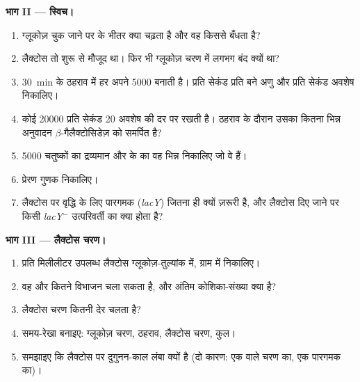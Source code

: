 \begin{problem}
\medskip
\noindent\textbf{भाग II --- स्विच।}
\begin{enumerate}[resume]
  \item ग्लूकोज़ चुक जाने पर  के भीतर क्या चढ़ता है और वह किससे
        बँधता है?
  \item लैक्टोस तो शुरू से मौजूद था। फिर भी ग्लूकोज़ चरण में 
        लगभग बंद क्यों था?
  \item \qty{30}{min} के ठहराव में हर  अपने \num{5000}
         बनाती है। प्रति सेकंड प्रति  बने  अणु और
        प्रति सेकंड अवशेष निकालिए।
  \item कोई  \num{20000}  प्रति सेकंड \qty{20}{} अवशेष
        की दर पर रखती है। ठहराव के दौरान उसका कितना भिन्न अनुवादन
        $\beta$-गैलैक्टोसिडेज़ को समर्पित है?
  \item \num{5000} चतुष्कों का द्रव्यमान और  के  का वह
        भिन्न निकालिए जो वे हैं।
  \item प्रेरण गुणक निकालिए।
  \item लैक्टोस पर वृद्धि के लिए पारगमक (\emph{lacY})  जितना ही
        क्यों ज़रूरी है, और लैक्टोस दिए जाने पर किसी \emph{lacY}$^-$
        उत्परिवर्ती का क्या होता है?
\end{enumerate}

\medskip
\noindent\textbf{भाग III --- लैक्टोस चरण।}
\begin{enumerate}[resume]
  \item प्रति मिलीलीटर उपलब्ध लैक्टोस ग्लूकोज़-तुल्यांक में, ग्राम में
        निकालिए।
  \item वह और कितने विभाजन चला सकता है, और अंतिम कोशिका-संख्या क्या है?
  \item लैक्टोस चरण कितनी देर चलता है?
  \item समय-रेखा बनाइए: ग्लूकोज़ चरण, ठहराव, लैक्टोस चरण, कुल।
  \item समझाइए कि लैक्टोस पर दुगुनन-काल लंबा क्यों है (दो कारण: एक
         वाले चरण का, एक पारगमक का)।
\end{enumerate}


\end{problem}
